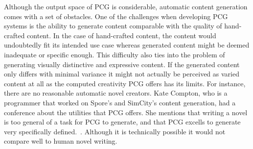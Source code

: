 Although the output space of PCG is considerable, automatic content generation comes with a set of obstacles.
One of the challenges when developing PCG systems is the ability to generate content comparable with the quality of hand-crafted content.
In the case of hand-crafted content, the content would undoubtedly fit its intended use case whereas generated content might be deemed inadequate or specific enough.
This difficulty also ties into the problem of generating visually distinctive and expressive content.
If the generated content only differs with minimal variance it might not actually be perceived as varied content at all as
the computed creativity PCG offers has its limits. For instance, there are no reasonable automatic novel creators. Kate Compton, who is a programmer that worked on Spore's and SimCity's content generation, had a conference about the utilities that PCG offers. She mentions that writing a novel is too general of a task for PCG to generate, and that PCG excells to generate very specifically defined.~\cite{PCG_for_everyone}. Although it is technically possible it would not compare well to human novel writing.







